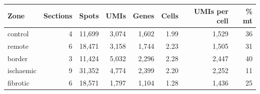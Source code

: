 \begin{tabular}{lrrrrrrr}
\toprule
Zone & Sections & Spots & UMIs & Genes & Cells & UMIs per cell & \% mt \\
\midrule
control & 4 & 11,699 & 3,074 & 1,602 & 1.99 & 1,529 & 36 \\
remote & 6 & 18,471 & 3,158 & 1,744 & 2.23 & 1,505 & 31 \\
border & 3 & 11,424 & 5,032 & 2,296 & 2.28 & 2,447 & 40 \\
ischaemic & 9 & 31,352 & 4,774 & 2,399 & 2.20 & 2,252 & 11 \\
fibrotic & 6 & 18,571 & 1,797 & 1,104 & 1.28 & 1,436 & 25 \\
\bottomrule
\end{tabular}
